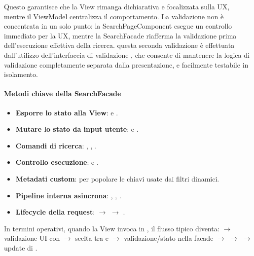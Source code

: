\noindent Questo garantisce che la View rimanga dichiarativa e focalizzata sulla UX, mentre il ViewModel centralizza il comportamento. La validazione non è concentrata in un solo punto: la SearchPageComponent esegue un controllo immediato per la UX, mentre la SearchFacade riafferma la validazione prima dell'esecuzione effettiva della ricerca. questa seconda validazione è effettuata dall'utilizzo dell'interfaccia di validazione , che consente di mantenere la logica di validazione completamente separata dalla presentazione, e facilmente testabile in isolamento.

\paragraph{Metodi chiave della SearchFacade}

\begin{itemize}
    \item \textbf{Esporre lo stato alla View}:  e .
    \item \textbf{Mutare lo stato da input utente}:  e .
    \item \textbf{Comandi di ricerca}: , , .
    \item \textbf{Controllo esecuzione}:  e .
    \item \textbf{Metadati custom}:  per popolare le chiavi usate dai filtri dinamici.
    \item \textbf{Pipeline interna asincrona}: , , .
    \item \textbf{Lifecycle della request}:  $\rightarrow$  $\rightarrow$ .
\end{itemize}

\noindent In termini operativi, quando la View invoca  in , il flusso tipico diventa:
 $\rightarrow$ validazione UI con  $\rightarrow$ scelta tra  e  $\rightarrow$ validazione/stato nella facade $\rightarrow$  $\rightarrow$  $\rightarrow$ update di .

